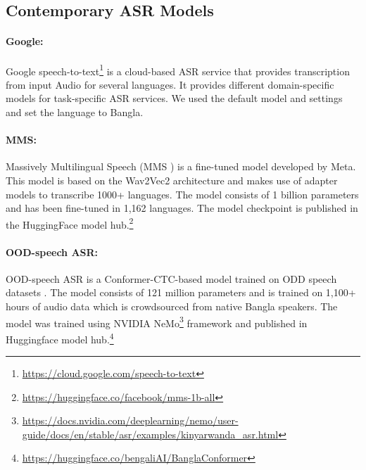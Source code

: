 \subsection{Contemporary ASR Models}


\paragraph{Google:} Google speech-to-text\footnote{\url{https://cloud.google.com/speech-to-text}} is a cloud-based ASR service that provides transcription from input Audio for several languages. It provides different domain-specific models for task-specific ASR services. We used the default model and settings and set the language to Bangla.



\paragraph{MMS:} Massively Multilingual Speech (MMS \cite{pratap2023scaling}) is a fine-tuned model developed by Meta. This model is based on the Wav2Vec2 \cite{baevski2020wav2vec} architecture and makes use of adapter models to transcribe 1000+ languages. The model consists of 1 billion parameters and has been fine-tuned in 1,162 languages. The model checkpoint is published in the HuggingFace model hub.\footnote{\url{https://huggingface.co/facebook/mms-1b-all}}

\paragraph{OOD-speech ASR:}
OOD-speech ASR is a Conformer-CTC-based model trained on ODD speech datasets \cite{rakib2023bangla}. The model consists of 121 million parameters and is trained on 1,100+ hours of audio data which is crowdsourced from native Bangla speakers. The model was trained using NVIDIA NeMo\footnote{\url{https://docs.nvidia.com/deeplearning/nemo/user-guide/docs/en/stable/asr/examples/kinyarwanda_asr.html}} framework and published in Huggingface model hub.\footnote{\url{https://huggingface.co/bengaliAI/BanglaConformer}}


